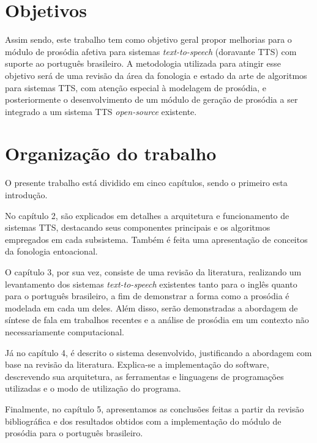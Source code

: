 \section{Objetivos}
Assim sendo, este trabalho tem como objetivo geral propor melhorias para o módulo de prosódia
afetiva para sistemas \emph{text-to-speech} (doravante TTS) com suporte ao
português brasileiro. A metodologia utilizada para atingir esse objetivo será de
uma revisão da área da fonologia e estado da arte de algoritmos para sistemas
TTS, com atenção especial à modelagem de prosódia, e posteriormente o
desenvolvimento de um módulo de geração de prosódia a ser integrado a um sistema
TTS \emph{open-source} existente.

\section{Organização do trabalho}
O presente trabalho está dividido em cinco capítulos, sendo o primeiro esta introdução.

No capítulo 2, são explicados em detalhes a arquitetura e funcionamento de sistemas
TTS, destacando seus componentes principais e os algoritmos empregados em cada
subsistema. Também é feita uma apresentação de conceitos da fonologia entoacional.


O capítulo 3, por sua vez, consiste de uma revisão da literatura, realizando um
levantamento dos sistemas \emph{text-to-speech} existentes tanto para o inglês
quanto para o português brasileiro, a fim de demonstrar a forma como a prosódia
é modelada em cada um deles. Além disso, serão demonstradas a abordagem de
síntese de fala em trabalhos recentes e a análise de prosódia em um contexto não
necessariamente computacional.

Já no capítulo 4, é descrito o sistema desenvolvido, justificando a abordagem com
base na revisão da literatura. Explica-se a implementação do software,
descrevendo sua arquitetura, as ferramentas e linguagens de programações
utilizadas e o modo de utilização do programa.

Finalmente, no capítulo 5, apresentamos as conclusões feitas a partir da revisão
bibliográfica e dos resultados obtidos com a implementação do módulo de prosódia
para o português brasileiro.